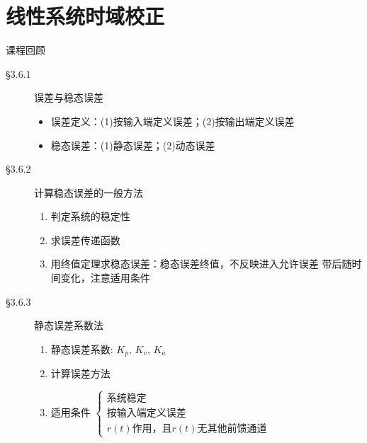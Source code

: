 \documentclass[handout,cjkutf8,table,aspectratio=1610]{beamer} %
\begin{document}
\setcounter{section}{6}
\section{线性系统时域校正}
\begin{frame}{课程回顾}
\begin{description}
\item[\S3.6.1]\alert{误差与稳态误差}
\begin{itemize}
\item 误差定义：(1)按输入端定义误差；(2)按输出端定义误差
\item 稳态误差：(1)静态误差；(2)动态误差
\end{itemize}
\item[\S3.6.2]\alert{计算稳态误差的一般方法}
\begin{enumerate}
\item 判定系统的稳定性 
\item 求误差传递函数 
\item 用终值定理求稳态误差：稳态误差终值，不反映进入允许误差  带后随时间变化，注意适用条件
\end{enumerate}
\item[\S3.6.3]\alert{静态误差系数法}
\begin{enumerate}
\item  静态误差系数: $K_p$, $K_v$, $K_a$
\item 计算误差方法
\item 适用条件
$\begin{cases}
\text{系统稳定}\\
\text{按输入端定义误差}\\
r(t)\text{作用，且}r(t)\text{无其他前馈通道} 
\end{cases}$
\end{enumerate}
\end{description}
\end{frame}
\end{document}
